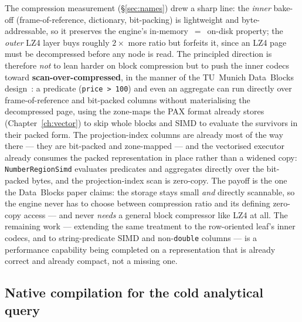 \documentclass[11pt,a4paper,oneside]{report}
\theoremstyle{sirixthm}
\newcommand{\code}[1]{\texttt{#1}}
\begin{document}
The compression measurement (\S\ref{sec:names}) drew a sharp line: the \emph{inner} bake-off
(frame-of-reference, dictionary, bit-packing) is lightweight and byte-addressable, so it preserves the
engine's \mbox{in-memory~$=$~on-disk} property; the \emph{outer} LZ4 layer buys roughly $2\times$ more ratio
but forfeits it, since an LZ4 page must be decompressed before any node is read. The principled direction
is therefore \emph{not} to lean harder on block compression but to push the inner codecs toward
\textbf{scan-over-compressed}, in the manner of the TU~Munich Data~Blocks design~\cite{datablocks}: a
predicate (\code{price > 100}) and even an aggregate can run directly over frame-of-reference and
bit-packed columns without materialising the decompressed page, using the zone-maps the PAX format already
stores (Chapter~\ref{ch:vector}) to skip whole blocks and SIMD to evaluate the survivors in their packed
form. The projection-index columns are already most of the way there --- they are bit-packed and
zone-mapped --- and the vectorised executor already consumes the packed representation in place rather
than a widened copy: \code{NumberRegionSimd} evaluates predicates and aggregates directly over the
bit-packed bytes, and the projection-index scan is zero-copy. The
payoff is the one the Data~Blocks paper claims: the storage stays small \emph{and} directly scannable, so
the engine never has to choose between compression ratio and its defining zero-copy access --- and never
\emph{needs} a general block compressor like LZ4 at all. The remaining work --- extending the same
treatment to the row-oriented leaf's inner codecs, and to string-predicate SIMD and non-\code{double}
columns --- is a performance capability being completed on a representation that is already correct and
already compact, not a missing one.

\subsection*{Native compilation for the cold analytical query}
\end{document}
